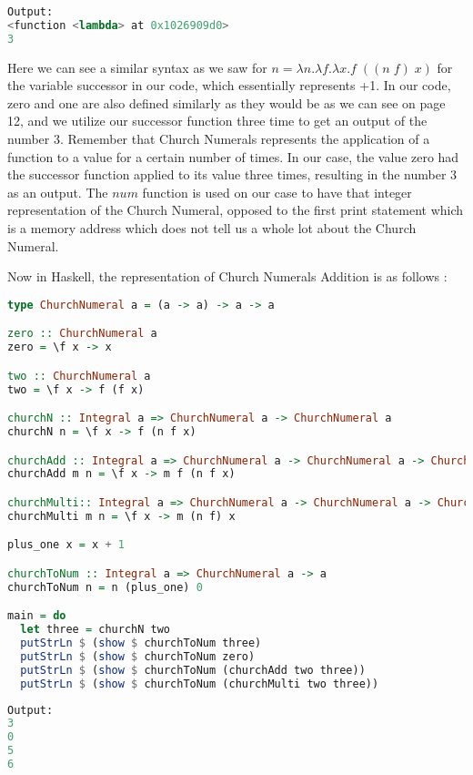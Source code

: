\documentclass{article}
\begin{document}
\begin{lstlisting}[language=Python]
Output:
<function <lambda> at 0x1026909d0>
3
\end{lstlisting}
\noindent
Here we can see a similar syntax as we saw for $ n = \lambda n. \lambda f. \lambda x.f \; ((n \; f) \; x)$ for the variable successor in our code, which essentially represents +1. In our code, zero and one are also defined similarly as they would be as we can see on page 12, and we utilize our successor function three time to get an output of the number 3. Remember that Church Numerals represents the application of a function to a value for a certain number of times.  In our case, the value zero had the successor function applied to its value three times, resulting in the number 3 as an output. The $num$ function is used on our case to have that integer representation of the Church Numeral, opposed to the first print statement which is a memory address which does not tell us a whole lot about the Church Numeral. 

\medskip\noindent
Now in Haskell, the representation of Church Numerals Addition is as follows \cite{Church Numerals in Haskell}:

\begin{lstlisting}[language=haskell] 
type ChurchNumeral a = (a -> a) -> a -> a

zero :: ChurchNumeral a
zero = \f x -> x

two :: ChurchNumeral a
two = \f x -> f (f x)

churchN :: Integral a => ChurchNumeral a -> ChurchNumeral a
churchN n = \f x -> f (n f x)

churchAdd :: Integral a => ChurchNumeral a -> ChurchNumeral a -> ChurchNumeral a
churchAdd m n = \f x -> m f (n f x)

churchMulti:: Integral a => ChurchNumeral a -> ChurchNumeral a -> ChurchNumeral a
churchMulti m n = \f x -> m (n f) x

plus_one x = x + 1

churchToNum :: Integral a => ChurchNumeral a -> a
churchToNum n = n (plus_one) 0

main = do
  let three = churchN two
  putStrLn $ (show $ churchToNum three)
  putStrLn $ (show $ churchToNum zero)
  putStrLn $ (show $ churchToNum (churchAdd two three))
  putStrLn $ (show $ churchToNum (churchMulti two three))
\end{lstlisting}
\begin{lstlisting}[language=Python]
Output:
3
0
5
6
\end{lstlisting}
\end{document}
